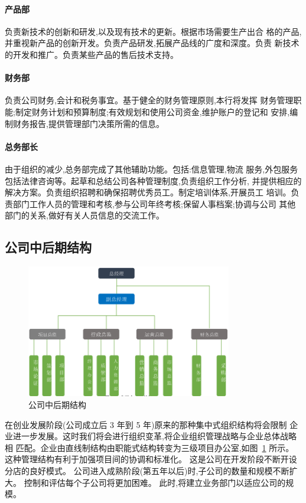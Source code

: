 \paragraph{产品部}
负责新技术的创新和研发,以及现有技术的更新。根据市场需要生产出合
格的产品,并重视新产品的创新开发。负责产品研发,拓展产品线的广度和深度。负责
新技术的开发和推广。负责某些产品的售后技术支持。
\paragraph{财务部}
负责公司财务,会计和税务事宜。基于健全的财务管理原则,本行将发挥
财务管理职能;制定财务计划和预算制度;有效规划和使用公司资金,维护账户的登记和
安排,编制财务报告,提供管理部门决策所需的信息。
\paragraph{总务部长}
由于组织的减少,总务部完成了其他辅助功能。包括:信息管理,物流
服务,外包服务包括法律咨询等。起草和总结公司各种管理制度,负责组织工作分析,
并提供相应的解决方案。负责组织招聘和确保招聘优秀员工。制定培训体系,开展员工
培训。负责部门工作人员的管理和考核,参与公司年终考核;保留人事档案;协调与公司
其他部门的关系,做好有关人员信息的交流工作。

\subsection{公司中后期结构}
\begin{figure}[htbp]
\centering
\label{fig:late-struct}
\includegraphics[width=0.8\textwidth]{../images/company/后期结构}
\caption{公司中后期结构}
\end{figure}

在创业发展阶段(公司成立后 3 年到 5 年)原来的那种集中式组织结构将会限制
企业进一步发展。这时我们将会进行组织变革,将企业组织管理战略与企业总体战略相
匹配。企业由直线制结构由职能式结构转变为三级项目办公室,如图~\ref{fig:late-struct}
所示。 这种管理结构有利于加强项目间的协调和标准化。 这是公司在开发阶段不断开设
分店的良好模式。 公司进入成熟阶段(第五年以后)时,子公司的数量和规模不断扩
大。 控制和评估每个子公司将更加困难。 此时,将建立业务部门以适应公司的规模。

